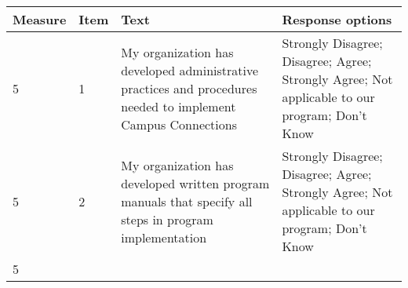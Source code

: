\documentclass[]{article}
\begin{document}
\begin{longtable}[]{@{}llll@{}}
\toprule
\begin{minipage}[b]{0.05\columnwidth}\raggedright\strut
Measure\strut
\end{minipage} & \begin{minipage}[b]{0.04\columnwidth}\raggedright\strut
Item\strut
\end{minipage} & \begin{minipage}[b]{0.40\columnwidth}\raggedright\strut
Text\strut
\end{minipage} & \begin{minipage}[b]{0.40\columnwidth}\raggedright\strut
Response options\strut
\end{minipage}\tabularnewline
\midrule
\endhead
\begin{minipage}[t]{0.05\columnwidth}\raggedright\strut
5\strut
\end{minipage} & \begin{minipage}[t]{0.04\columnwidth}\raggedright\strut
1\strut
\end{minipage} & \begin{minipage}[t]{0.40\columnwidth}\raggedright\strut
My organization has developed administrative practices and procedures
needed to implement Campus Connections\strut
\end{minipage} & \begin{minipage}[t]{0.40\columnwidth}\raggedright\strut
Strongly Disagree; Disagree; Agree; Strongly Agree; Not applicable to
our program; Don't Know\strut
\end{minipage}\tabularnewline
\begin{minipage}[t]{0.05\columnwidth}\raggedright\strut
5\strut
\end{minipage} & \begin{minipage}[t]{0.04\columnwidth}\raggedright\strut
2\strut
\end{minipage} & \begin{minipage}[t]{0.40\columnwidth}\raggedright\strut
My organization has developed written program manuals that specify all
steps in program implementation\strut
\end{minipage} & \begin{minipage}[t]{0.40\columnwidth}\raggedright\strut
Strongly Disagree; Disagree; Agree; Strongly Agree; Not applicable to
our program; Don't Know\strut
\end{minipage}\tabularnewline
\begin{minipage}[t]{0.05\columnwidth}\raggedright\strut
5\strut
\end{minipage} & \begin{minipage}[t]{0.04\columnwidth}\raggedright\strut

\end{minipage}
\end{longtable}
\end{document}
